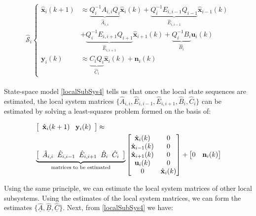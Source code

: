\documentclass[journal,10pt]{IEEEtran}
\begin{document}
\begin{small}
\begin{align}
\begin{array}{l}
\hat{\mathcal{S}}_{i} \left\{ \begin{array} {rl}
\hat{\mathbf{x}}_{i}(k+1)& \approx \underbrace{Q_{i}^{-1}A_{i,i}Q_{i}}_{\hat{A}_{i,i}}\hat{\mathbf{x}}_{i}(k)+\underbrace{Q_{i}^{-1}E_{i,i-1}Q_{i-1}}_{\hat{E}_{i,i-1}}\hat{\mathbf{x}}_{i-1}(k) \\ & +\underbrace{Q_{i}^{-1}E_{i,i+1}Q_{i+1}}_{\hat{E}_{i,i+1}}\hat{\mathbf{x}}_{i+1}(k)  +\underbrace{Q_{i}^{-1}B_{i}}_{\hat{B}_{i}}\mathbf{u}_{i}(k) \\
\mathbf{y}_{i}(k)& \approx \underbrace{C_{i}Q_{i}}_{\hat{C}_{i}}\hat{\mathbf{x}}_{i}(k)+ \mathbf{n}_{i}(k)   \end{array} \right. 
\end{array}
\label{localSubSys4}
\end{align}
\end{small}
State-space model \eqref{localSubSys4} tells us that once the local state sequences are estimated, the local system matrices $\{\hat{A}_{i,i}, \hat{E}_{i,i-1}, \hat{E}_{i,i+1}, \hat{B}_{i}, \hat{C}_{i}\}$ can be estimated by solving a least-squares problem formed on the basis of:
\begin{small}
\begin{align}
&\left[\begin{array}{l}\hat{\mathbf{x}}_{i}(k+1) \;\;\; \mathbf{y}_{i}(k) \end{array}\right]\approx \notag \\
& \underbrace{\left[\begin{array}{l} \hat{A}_{i,i} \;\; \hat{E}_{i,i-1}\;\;\hat{E}_{i,i+1}\;\; \hat{B}_{i}\;\; \hat{C}_{i}\end{array}\right]}_{\text{matrices to be estimated}}\begin{bmatrix}\hat{\mathbf{x}}_{i}(k) & 0 \\ \hat{\mathbf{x}}_{i-1}(k) & 0 \\
\hat{\mathbf{x}}_{i+1}(k) & 0 \\ \mathbf{u}_{i}(k) & 0 \\ 0 & \hat{\mathbf{x}}_{i}(k) \end{bmatrix}+\begin{bmatrix}0 & \mathbf{n}_{i}(k) \end{bmatrix}
\label{simpleLinearRegression}
\end{align}
\end{small}
Using the same principle, we can estimate the local system matrices of other local subsystems. Using the estimates of the local system matrices, we can form the estimates $\{ \underline{\hat{A}},\underline{\hat{B}}, \underline{\hat{C}}\}$. Next, from \eqref{localSubSys4} we have:
\end{document}

